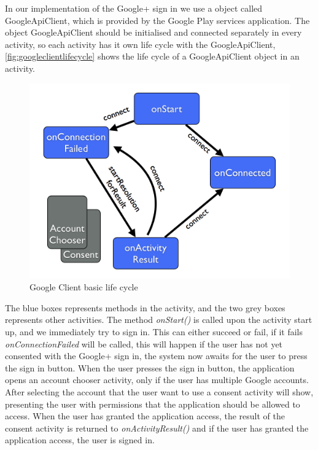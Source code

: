 In our implementation of the Google+ sign in we use a object called \\GoogleApiClient\citep{googleapiclient-docs}, which is provided by the Google Play services application. 
The object GoogleApiClient should be initialised and connected separately in every activity, so each activity has it own life cycle with the GoogleApiClient, \autoref{fig:googleclientlifecycle} shows the life cycle of a GoogleApiClient object in an activity.
\begin{figure}[H]
\centering
\includegraphics[width=0.8\linewidth]{img/googleclientflow.png}
\caption{Google Client basic life cycle\cite{googleapiclient-lifecycle}}
\label{fig:googleclientlifecycle}
\end{figure}
The blue boxes represents methods in the activity, and the two grey boxes represents other activities. The method \textit{onStart()} is called upon the activity start up, and we immediately try to sign in. This can either succeed or fail, if it fails \textit{onConnectionFailed} will be called, this will happen if the user has not yet consented with the Google+ sign in, the system now awaits for the user to press the sign in button. 
When the user presses the sign in button, the application opens an account chooser activity, only if the user has multiple Google accounts. 
After selecting the account that the user want to use a consent activity will show, presenting the user with permissions that the application should be allowed to access. When the user has granted the application access, the result of the consent activity is returned to \textit{onActivityResult()} and if the user has granted the application access, the user is signed in.

